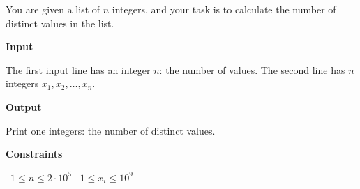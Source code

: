 You are given a list of $n$ integers, and your task is to calculate the number of distinct values in the list.

\vspace{0.3cm}\noindent\textbf{Input}

The first input line has an integer $n$: the number of values.
The second line has $n$ integers $x_1,x_2,\dots,x_n$.

\vspace{0.3cm}\noindent\textbf{Output}

Print one integers: the number of distinct values.

\vspace{0.3cm}\noindent\textbf{Constraints}

\textbullet\ $1 \le n \le 2 \cdot 10^5$
\textbullet\ $1 \le x_i \le 10^9$
